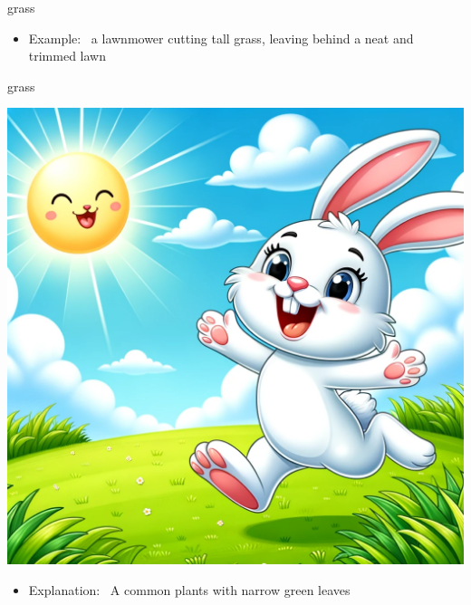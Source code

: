 \documentclass[avery5371, grid,frame]{flashcards}
\begin{document}
\begin{flashcard}{grass}
\begin{center}
\begin{minipage}[c]{.45\textwidth}
\begin{itemize}
            \item Example: \ a lawnmower cutting tall grass, leaving behind a neat and trimmed lawn
            \end{itemize}
        \end{minipage}
    \end{center}
    \vspace*{\fill}
\end{flashcard}\begin{flashcard}{grass}
    \vspace*{\fill}
    \begin{center}
        \begin{minipage}[c]{.45\textwidth}
            \includegraphics[width=\textwidth]{cards/g/grass/grass - a joyful rabbit hopping on a vibrant green grassy meadow under a sunny sky.png}
        \end{minipage}
        \begin{minipage}[c]{.45\textwidth}
            \begin{itemize}\setlength\itemsep{12pt}
            \item Explanation: \ A common plants with narrow green leaves


\end{itemize}
\end{minipage}
\end{center}
\end{flashcard}
\end{document}
